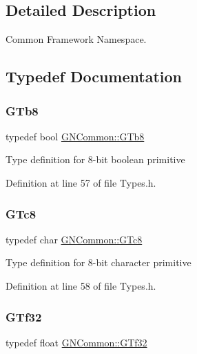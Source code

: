 \subsection{Detailed Description}
Common Framework Namespace. 

\subsection{Typedef Documentation}
\mbox{\label{namespace_g_n_common_a6b5283329f609e2175dd0c91fc1520ba}} 
\subsubsection{\texorpdfstring{G\+Tb8}{GTb8}}
{\footnotesize\ttfamily typedef bool \mbox{\hyperlink{namespace_g_n_common_a6b5283329f609e2175dd0c91fc1520ba}{G\+N\+Common\+::\+G\+Tb8}}}

Type definition for 8-\/bit boolean primitive 

Definition at line 57 of file Types.\+h.

\mbox{\label{namespace_g_n_common_a60a636fae316405f6926d7c1cf5fb97b}} 
\subsubsection{\texorpdfstring{G\+Tc8}{GTc8}}
{\footnotesize\ttfamily typedef char \mbox{\hyperlink{namespace_g_n_common_a60a636fae316405f6926d7c1cf5fb97b}{G\+N\+Common\+::\+G\+Tc8}}}

Type definition for 8-\/bit character primitive 

Definition at line 58 of file Types.\+h.

\mbox{\label{namespace_g_n_common_a95fc9a7f3918597669a4d0bd371d2e9b}} 
\subsubsection{\texorpdfstring{G\+Tf32}{GTf32}}
{\footnotesize\ttfamily typedef float \mbox{\hyperlink{namespace_g_n_common_a95fc9a7f3918597669a4d0bd371d2e9b}{G\+N\+Common\+::\+G\+Tf32}}}

